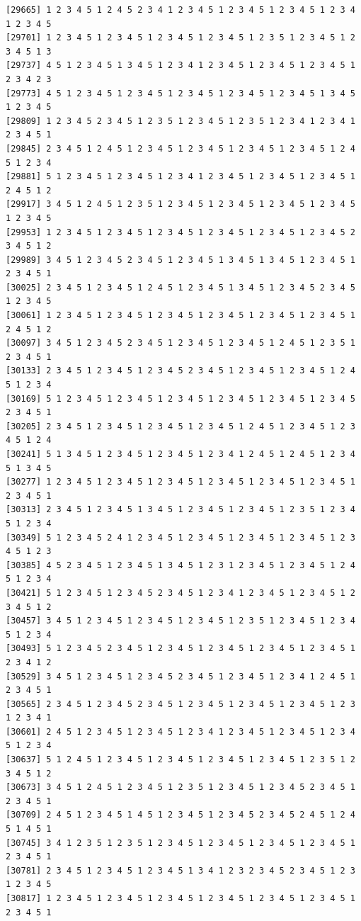 \documentclass[
  english,
]{book}
\begin{document}
\begin{verbatim}
[29665] 1 2 3 4 5 1 2 4 5 2 3 4 1 2 3 4 5 1 2 3 4 5 1 2 3 4 5 1 2 3 4 1 2 3 4 5
[29701] 1 2 3 4 5 1 2 3 4 5 1 2 3 4 5 1 2 3 4 5 1 2 3 5 1 2 3 4 5 1 2 3 4 5 1 3
[29737] 4 5 1 2 3 4 5 1 3 4 5 1 2 3 4 1 2 3 4 5 1 2 3 4 5 1 2 3 4 5 1 2 3 4 2 3
[29773] 4 5 1 2 3 4 5 1 2 3 4 5 1 2 3 4 5 1 2 3 4 5 1 2 3 4 5 1 3 4 5 1 2 3 4 5
[29809] 1 2 3 4 5 2 3 4 5 1 2 3 5 1 2 3 4 5 1 2 3 5 1 2 3 4 1 2 3 4 1 2 3 4 5 1
[29845] 2 3 4 5 1 2 4 5 1 2 3 4 5 1 2 3 4 5 1 2 3 4 5 1 2 3 4 5 1 2 4 5 1 2 3 4
[29881] 5 1 2 3 4 5 1 2 3 4 5 1 2 3 4 1 2 3 4 5 1 2 3 4 5 1 2 3 4 5 1 2 4 5 1 2
[29917] 3 4 5 1 2 4 5 1 2 3 5 1 2 3 4 5 1 2 3 4 5 1 2 3 4 5 1 2 3 4 5 1 2 3 4 5
[29953] 1 2 3 4 5 1 2 3 4 5 1 2 3 4 5 1 2 3 4 5 1 2 3 4 5 1 2 3 4 5 2 3 4 5 1 2
[29989] 3 4 5 1 2 3 4 5 2 3 4 5 1 2 3 4 5 1 3 4 5 1 3 4 5 1 2 3 4 5 1 2 3 4 5 1
[30025] 2 3 4 5 1 2 3 4 5 1 2 4 5 1 2 3 4 5 1 3 4 5 1 2 3 4 5 2 3 4 5 1 2 3 4 5
[30061] 1 2 3 4 5 1 2 3 4 5 1 2 3 4 5 1 2 3 4 5 1 2 3 4 5 1 2 3 4 5 1 2 4 5 1 2
[30097] 3 4 5 1 2 3 4 5 2 3 4 5 1 2 3 4 5 1 2 3 4 5 1 2 4 5 1 2 3 5 1 2 3 4 5 1
[30133] 2 3 4 5 1 2 3 4 5 1 2 3 4 5 2 3 4 5 1 2 3 4 5 1 2 3 4 5 1 2 4 5 1 2 3 4
[30169] 5 1 2 3 4 5 1 2 3 4 5 1 2 3 4 5 1 2 3 4 5 1 2 3 4 5 1 2 3 4 5 2 3 4 5 1
[30205] 2 3 4 5 1 2 3 4 5 1 2 3 4 5 1 2 3 4 5 1 2 4 5 1 2 3 4 5 1 2 3 4 5 1 2 4
[30241] 5 1 3 4 5 1 2 3 4 5 1 2 3 4 5 1 2 3 4 1 2 4 5 1 2 4 5 1 2 3 4 5 1 3 4 5
[30277] 1 2 3 4 5 1 2 3 4 5 1 2 3 4 5 1 2 3 4 5 1 2 3 4 5 1 2 3 4 5 1 2 3 4 5 1
[30313] 2 3 4 5 1 2 3 4 5 1 3 4 5 1 2 3 4 5 1 2 3 4 5 1 2 3 5 1 2 3 4 5 1 2 3 4
[30349] 5 1 2 3 4 5 2 4 1 2 3 4 5 1 2 3 4 5 1 2 3 4 5 1 2 3 4 5 1 2 3 4 5 1 2 3
[30385] 4 5 2 3 4 5 1 2 3 4 5 1 3 4 5 1 2 3 1 2 3 4 5 1 2 3 4 5 1 2 4 5 1 2 3 4
[30421] 5 1 2 3 4 5 1 2 3 4 5 2 3 4 5 1 2 3 4 1 2 3 4 5 1 2 3 4 5 1 2 3 4 5 1 2
[30457] 3 4 5 1 2 3 4 5 1 2 3 4 5 1 2 3 4 5 1 2 3 5 1 2 3 4 5 1 2 3 4 5 1 2 3 4
[30493] 5 1 2 3 4 5 2 3 4 5 1 2 3 4 5 1 2 3 4 5 1 2 3 4 5 1 2 3 4 5 1 2 3 4 1 2
[30529] 3 4 5 1 2 3 4 5 1 2 3 4 5 2 3 4 5 1 2 3 4 5 1 2 3 4 1 2 4 5 1 2 3 4 5 1
[30565] 2 3 4 5 1 2 3 4 5 2 3 4 5 1 2 3 4 5 1 2 3 4 5 1 2 3 4 5 1 2 3 1 2 3 4 1
[30601] 2 4 5 1 2 3 4 5 1 2 3 4 5 1 2 3 4 1 2 3 4 5 1 2 3 4 5 1 2 3 4 5 1 2 3 4
[30637] 5 1 2 4 5 1 2 3 4 5 1 2 3 4 5 1 2 3 4 5 1 2 3 4 5 1 2 3 5 1 2 3 4 5 1 2
[30673] 3 4 5 1 2 4 5 1 2 3 4 5 1 2 3 5 1 2 3 4 5 1 2 3 4 5 2 3 4 5 1 2 3 4 5 1
[30709] 2 4 5 1 2 3 4 5 1 4 5 1 2 3 4 5 1 2 3 4 5 2 3 4 5 2 4 5 1 2 4 5 1 4 5 1
[30745] 3 4 1 2 3 5 1 2 3 5 1 2 3 4 5 1 2 3 4 5 1 2 3 4 5 1 2 3 4 5 1 2 3 4 5 1
[30781] 2 3 4 5 1 2 3 4 5 1 2 3 4 5 1 3 4 1 2 3 2 3 4 5 2 3 4 5 1 2 3 1 2 3 4 5
[30817] 1 2 3 4 5 1 2 3 4 5 1 2 3 4 5 1 2 3 4 5 1 2 3 4 5 1 2 3 4 5 1 2 3 4 5 1

\end{verbatim}
\end{document}
